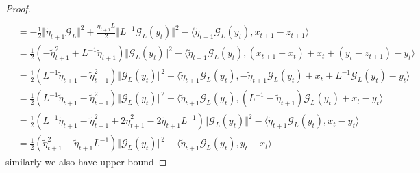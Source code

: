 \documentclass[12pt]{article}
\begin{document}
\begin{proof}
\begin{align*}
                \\
                &= 
                - \frac{1}{2}\Vert \tilde\eta_{t + 1} \mathcal G_L\Vert^2 + 
                \frac{\tilde\eta_{t + 1}L}{2}\Vert L^{-1} \mathcal G_L(y_t)\Vert^2
                - 
                \langle \tilde\eta_{t + 1} \mathcal G_L(y_t), x_{t + 1} - z_{t + 1} \rangle
                \\
                &= 
                \frac{1}{2}\left(
                    - \tilde\eta_{t + 1}^2 + 
                    L^{-1}\tilde\eta_{t + 1}
                \right)\Vert \mathcal G_L(y_t)\Vert^2
                - 
                \langle 
                    \tilde\eta_{t + 1} \mathcal G_L(y_t), 
                    (x_{t + 1} - x_{t}) + x_t
                    + (y_t - z_{t + 1}) - y_t
                \rangle
                \\
                &= 
                \frac{1}{2}\left(
                    L^{-1}\tilde\eta_{t + 1}
                    - \tilde\eta_{t + 1}^2
                \right)\Vert \mathcal G_L(y_t)\Vert^2
                - 
                \langle 
                    \tilde\eta_{t + 1} \mathcal G_L(y_t), 
                    -\tilde\eta_{t + 1}\mathcal G_L(y_t) + x_t 
                    + L^{-1}\mathcal G_L(y_t) - y_t
                \rangle
                \\
                &= 
                \frac{1}{2}\left(
                    L^{-1}\tilde\eta_{t + 1}
                    - \tilde\eta_{t + 1}^2
                \right)\Vert \mathcal G_L(y_t)\Vert^2
                - \langle 
                    \tilde\eta_{t +1}\mathcal G_L(y_t), 
                    (L^{-1} - \tilde\eta_{t + 1})\mathcal G_L(y_t) + x_t - y_t
                \rangle
                \\
                &= \frac{1}{2}\left(
                    L^{-1}\tilde\eta_{t + 1} - \tilde\eta_{t + 1}^2 
                    + 2 \tilde\eta_{t + 1}^2 - 2\tilde\eta_{t + 1}L^{-1}
                \right)\Vert \mathcal G_L(y_t)\Vert^2
                - 
                \langle 
                    \tilde\eta_{t + 1} \mathcal G_L(y_t), 
                    x_t - y_t
                \rangle
                \\
                &= 
                \frac{1}{2}\left(
                    \tilde\eta_{t + 1}^2 - \tilde\eta_{t + 1}L^{-1}
                \right)\Vert \mathcal G_L(y_t)\Vert^2 
                + \langle \tilde\eta_{t + 1} \mathcal G_L(y_t), y_t - x_t\rangle
            \end{align*}
            similarly we also have upper bound 

\end{proof}
\end{document}
